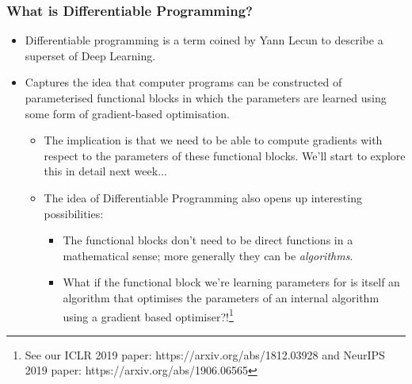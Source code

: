 \documentclass[]{article}
\begin{document}
\begin{frame}
\frametitle{What is Differentiable Programming?}

\begin{itemize}
	\item<+-> Differentiable programming is a term coined by Yann Lecun to describe a superset of Deep Learning.
	\item<+-> Captures the idea that computer programs can be constructed of parameterised functional blocks in which the parameters are learned using some form of gradient-based optimisation.
	\begin{itemize}
		\item<+-> The implication is that we need to be able to compute gradients with respect to the parameters of these functional blocks. We'll start to explore this in detail next week...
		\item<+-> The idea of Differentiable Programming also opens up interesting possibilities:
		\begin{itemize}
			\item The functional blocks don't need to be direct functions in a mathematical sense; more generally they can be \emph{algorithms}.
			\item What if the functional block we're learning parameters for is itself an algorithm that optimises the parameters of an internal algorithm using a gradient based optimiser?!\footnote{See our ICLR 2019 paper: https://arxiv.org/abs/1812.03928 and NeurIPS 2019 paper: https://arxiv.org/abs/1906.06565}
		\end{itemize}
	\end{itemize}
\end{itemize}
\end{frame}
\end{document}
